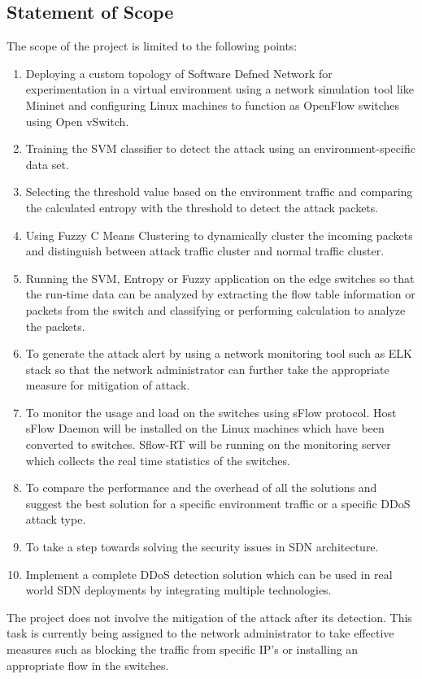 \documentclass[12pt,a4paper,final]{report}
\begin{document}
\subsection{Statement of Scope}
The scope of the project is limited to the following points:
\begin{enumerate}
\item
Deploying a custom topology of Software Defned Network for experimentation in a virtual environment using a network simulation tool like Mininet and configuring Linux machines to function as OpenFlow switches using Open vSwitch.

\item
Training the SVM classifier to detect the attack using an environment-specific data set.

\item
Selecting the threshold value based on the environment traffic and comparing the calculated
entropy with the threshold to detect the attack packets.

\item
Using Fuzzy C Means Clustering to dynamically cluster the incoming packets and distinguish between attack traffic cluster and normal traffic cluster.

\item
Running the SVM, Entropy or Fuzzy application on the edge switches so that the run-time data can be analyzed by extracting the flow table information or packets from the switch and classifying or performing calculation to analyze the packets.

\item
To generate the attack alert by using a network monitoring tool such as ELK stack so that the network administrator can further take the appropriate measure for mitigation of attack.

\item
To monitor the usage and load on the switches using sFlow protocol. Host sFlow Daemon will be installed on the Linux machines which have been converted to switches. Sflow-RT will be running on the monitoring server which collects the real time statistics of the switches.

\item
To compare the performance and the overhead of all the solutions and suggest the best solution for a specific environment traffic or a specific DDoS attack type.

\item
To take a step towards solving the security issues in SDN architecture.

\item
Implement a complete DDoS detection solution which can be used in real world SDN deployments by integrating multiple technologies. 
\end{enumerate}
\newpage
The project does not involve the mitigation of the attack after its detection. This task is currently being assigned to the network administrator to take effective measures such as blocking the traffic from specific IP's or installing an appropriate flow in the switches. \\
\end{document}
